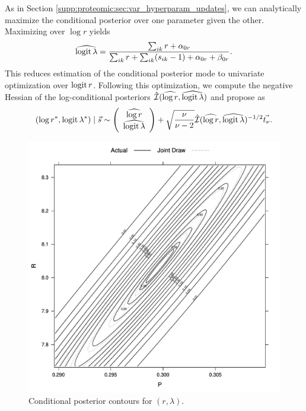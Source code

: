 As in Section \ref{supp:proteomic:sec:var_hyperparam_updates}, we can analytically maximize  the conditional posterior over one parameter given the other.
Maximizing over $\log r$ yields
%
\begin{equation*}
\widehat{\operatorname{logit} \lambda} = \frac{\sum_{ik}r + \alpha_{0r}}{\sum_{ik}r+\sum_{ik}(s_{ik}-1) + \alpha_{0r} + \beta_{0r}} .
\end{equation*}
%
This reduces estimation of the conditional posterior mode to univariate optimization over $\operatorname{logit} r$.
Following this optimization, we compute the negative Hessian of the log-conditional posteriors $\hat{\mathcal{I}}(\widehat{\log r}, \widehat{\operatorname{logit} \lambda})$ and propose as
\begin{equation*}
(\log r^*, \operatorname{logit} \lambda^*) \mid \vec s \sim \left(\begin{array}{c}
\widehat{\log r} \\
\widehat{\operatorname{logit} \lambda}
\end{array}\right) +
\sqrt{\frac{\nu}{\nu - 2}} \hat{\mathcal{I}}(\widehat{\log r}, \widehat{\operatorname{logit} \lambda})^{-1/2} \vec{t_{\nu}} .
\end{equation*}


\begin{figure}
\centering
\includegraphics[width=1\textwidth]{figures/proteomics/Neg_Bin_Parameter_Draw}
\caption{Conditional posterior contours for $(r, \lambda)$.\label{supp:proteomics:fig:Negative-binomial-parameters}}
\end{figure}


